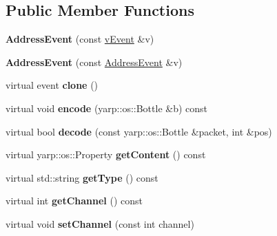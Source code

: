 \subsection*{Public Member Functions}
\begin{DoxyCompactItemize}
\item 
{\bfseries Address\+Event} (const \hyperlink{classev_1_1vEvent}{v\+Event} \&v)\hypertarget{classev_1_1AddressEvent_a62e810ce50e155828957e61c99a165d2}{}\label{classev_1_1AddressEvent_a62e810ce50e155828957e61c99a165d2}

\item 
{\bfseries Address\+Event} (const \hyperlink{classev_1_1AddressEvent}{Address\+Event} \&v)\hypertarget{classev_1_1AddressEvent_a5072b43ca93fdcdf0294ecff78f3b424}{}\label{classev_1_1AddressEvent_a5072b43ca93fdcdf0294ecff78f3b424}

\item 
virtual event {\bfseries clone} ()\hypertarget{classev_1_1AddressEvent_adabe75246de88f722d65b4994c7955eb}{}\label{classev_1_1AddressEvent_adabe75246de88f722d65b4994c7955eb}

\item 
virtual void {\bfseries encode} (yarp\+::os\+::\+Bottle \&b) const \hypertarget{classev_1_1AddressEvent_a38b726cef241624c31312a3eb1f46730}{}\label{classev_1_1AddressEvent_a38b726cef241624c31312a3eb1f46730}

\item 
virtual bool {\bfseries decode} (const yarp\+::os\+::\+Bottle \&packet, int \&pos)\hypertarget{classev_1_1AddressEvent_a91d805c2aeb136bb23e4da04e29d98b1}{}\label{classev_1_1AddressEvent_a91d805c2aeb136bb23e4da04e29d98b1}

\item 
virtual yarp\+::os\+::\+Property {\bfseries get\+Content} () const \hypertarget{classev_1_1AddressEvent_ad235efba4a6bd3fc79b853ecefad88c9}{}\label{classev_1_1AddressEvent_ad235efba4a6bd3fc79b853ecefad88c9}

\item 
virtual std\+::string {\bfseries get\+Type} () const \hypertarget{classev_1_1AddressEvent_aef0dd1b9a82c2745ccaa0cfc9105df55}{}\label{classev_1_1AddressEvent_aef0dd1b9a82c2745ccaa0cfc9105df55}

\item 
virtual int {\bfseries get\+Channel} () const \hypertarget{classev_1_1AddressEvent_a88038634ab480b42ac1f056abe004b5d}{}\label{classev_1_1AddressEvent_a88038634ab480b42ac1f056abe004b5d}

\item 
virtual void {\bfseries set\+Channel} (const int channel)\hypertarget{classev_1_1AddressEvent_a50e188b1c5702cab67a2175b81c32767}{}\label{classev_1_1AddressEvent_a50e188b1c5702cab67a2175b81c32767}

\end{DoxyCompactItemize}
